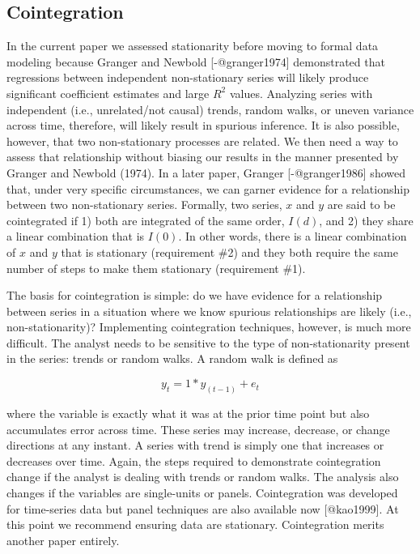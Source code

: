 \documentclass[]{article}
\begin{document}
\hypertarget{cointegration}{%
\subsection{Cointegration}\label{cointegration}}

In the current paper we assessed stationarity before moving to formal
data modeling because Granger and Newbold {[}-@granger1974{]}
demonstrated that regressions between independent non-stationary series
will likely produce significant coefficient estimates and large \(R^2\)
values. Analyzing series with independent (i.e., unrelated/not causal)
trends, random walks, or uneven variance across time, therefore, will
likely result in spurious inference. It is also possible, however, that
two non-stationary processes are related. We then need a way to assess
that relationship without biasing our results in the manner presented by
Granger and Newbold (1974). In a later paper, Granger
{[}-@granger1986{]} showed that, under very specific circumstances, we
can garner evidence for a relationship between two non-stationary
series. Formally, two series, \(x\) and \(y\) are said to be
cointegrated if 1) both are integrated of the same order, \(I(d)\), and
2) they share a linear combination that is \(I(0)\). In other words,
there is a linear combination of \(x\) and \(y\) that is stationary
(requirement \#2) and they both require the same number of steps to make
them stationary (requirement \#1).

The basis for cointegration is simple: do we have evidence for a
relationship between series in a situation where we know spurious
relationships are likely (i.e., non-stationarity)? Implementing
cointegration techniques, however, is much more difficult. The analyst
needs to be sensitive to the type of non-stationarity present in the
series: trends or random walks. A random walk is defined as

\begin{equation}
y_{t} = 1*y_{(t-1)} + e_{t}
\end{equation}

\noindent where the variable is exactly what it was at the prior time
point but also accumulates error across time. These series may increase,
decrease, or change directions at any instant. A series with trend is
simply one that increases or decreases over time. Again, the steps
required to demonstrate cointegration change if the analyst is dealing
with trends or random walks. The analysis also changes if the variables
are single-units or panels. Cointegration was developed for time-series
data but panel techniques are also available now {[}@kao1999{]}. At this
point we recommend ensuring data are stationary. Cointegration merits
another paper entirely.
\end{document}
